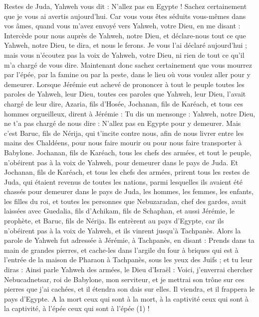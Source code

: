 \begin{multicols}{2}
Restes de Juda, Yahweh vous dit : N'allez pas en Egypte ! Sachez certainement que je vous ai avertis aujourd'hui.
Car vous vous êtes séduits vous-mêmes dans vos âmes, quand vous m'avez envoyé vers Yahweh, votre Dieu, en me disant : Intercède pour nous auprès de Yahweh, notre Dieu, et déclare-nous tout ce que Yahweh, notre Dieu, te dira, et nous le ferons.
Je vous l'ai déclaré aujourd'hui ; mais vous n’écoutez pas la voix de Yahweh, votre Dieu, ni rien de tout ce qu’il m’a chargé de vous dire.
Maintenant donc sachez certainement que vous mourrez par l'épée, par la famine ou par la peste, dans le lieu où vous voulez aller pour y demeurer.
\VerseOne{}Lorsque Jérémie eut achevé de prononcer à tout le peuple toutes les paroles de Yahweh, leur Dieu, toutes ces paroles que Yahweh, leur Dieu, l'avait chargé de leur dire,
Azaria, fils d’Hosée, Jochanan, fils de Karéach, et tous ces hommes orgueilleux, dirent à Jérémie : Tu dis un mensonge : Yahweh, notre Dieu, ne t'a pas chargé de nous dire : N'allez pas en Egypte pour y demeurer.
Mais c’est Baruc, fils de Nérija, qui t'incite contre nous, afin de nous livrer entre les mains des Chaldéens, pour nous faire mourir ou pour nous faire transporter à Babylone.
Jochanan, fils de Karéach, tous les chefs des armées, et tout le peuple, n'obéirent pas à la voix de Yahweh, pour demeurer dans le pays de Juda.
Et Jochanan, fils de Karéach, et tous les chefs des armées, prirent tous les restes de Juda, qui étaient revenus de toutes les nations, parmi lesquelles ils avaient été chassés pour demeurer dans le pays de Juda,
les hommes, les femmes, les enfants, les filles du roi, et toutes les personnes que Nebuzaradan, chef des gardes, avait laissées avec Guedalia, fils d'Achikam, fils de Schaphan, et aussi Jérémie, le prophète, et Baruc, fils de Nérija.
Ils entrèrent au pays d'Egypte, car ils n'obéirent pas à la voix de Yahweh, et ils vinrent jusqu'à Tachpanès.
Alors la parole de Yahweh fut adressée à Jérémie, à Tachpanès, en disant :
Prends dans ta main de grandes pierres, et cache-les dans l'argile du four à briques qui est à l'entrée de la maison de Pharaon à Tachpanès, sous les yeux des Juifs ;
et tu leur diras : Ainsi parle Yahweh des armées, le Dieu d'Israël : Voici, j’enverrai chercher Nebucadnetsar, roi de Babylone, mon serviteur, et je mettrai son trône sur ces pierres que j'ai cachées, et il étendra son dais sur elles.
Il viendra, et il frappera le pays d'Egypte. A la mort ceux qui sont à la mort, à la captivité ceux qui sont à la captivité, à l’épée ceux qui sont à l’épée\FTNT{} (1) !

\end{multicols}
